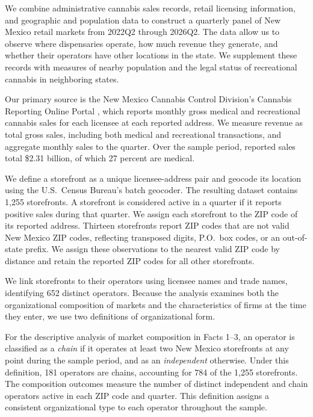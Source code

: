 \documentclass[english,12pt]{article}
\begin{document}
We combine administrative cannabis sales records, retail licensing information, and geographic and population data to construct a quarterly panel of New Mexico retail markets from 2022Q2 through 2026Q2. The data allow us to observe where dispensaries operate, how much revenue they generate, and whether their operators have other locations in the state. We supplement these records with measures of nearby population and the legal status of recreational cannabis in neighboring states.


Our primary source is the New Mexico Cannabis Control Division's Cannabis Reporting Online Portal \citep{NMCCDReporting}, which reports monthly gross medical and recreational cannabis sales for each licensee at each reported address. We measure revenue as total gross sales, including both medical and recreational transactions, and aggregate monthly sales to the quarter. Over the sample period, reported sales total \$2.31 billion, of which 27 percent are medical.

We define a storefront as a unique licensee-address pair and geocode its location using the U.S.\ Census Bureau's batch geocoder. The resulting dataset contains 1,255 storefronts. A storefront is considered active in a quarter if it reports positive sales during that quarter. We assign each storefront to the ZIP code of its reported address. Thirteen storefronts report ZIP codes that are not valid New Mexico ZIP codes, reflecting transposed digits, P.O.\ box codes, or an out-of-state prefix. We assign these observations to the nearest valid ZIP code by distance and retain the reported ZIP codes for all other storefronts.


We link storefronts to their operators using licensee names and trade names, identifying 652 distinct operators. Because the analysis examines both the organizational composition of markets and the characteristics of firms at the time they enter, we use two definitions of organizational form.

For the descriptive analysis of market composition in Facts 1--3, an operator is classified as a \emph{chain} if it operates at least two New Mexico storefronts at any point during the sample period, and as an \emph{independent} otherwise. Under this definition, 181 operators are chains, accounting for 784 of the 1,255 storefronts. The composition outcomes measure the number of distinct independent and chain operators active in each ZIP code and quarter. This definition assigns a consistent organizational type to each operator throughout the sample.
\end{document}
